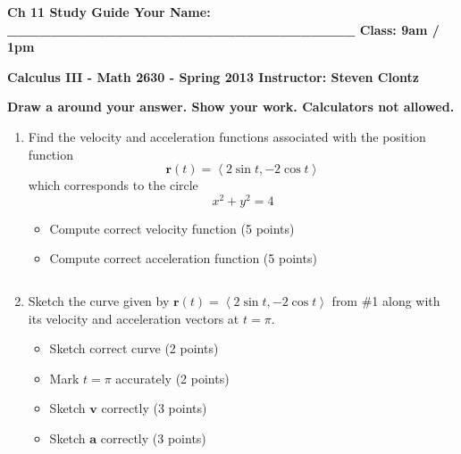 \documentclass[12pt]{article}
\newcommand{\up}{$~$\vspace*{-0.7in}}
\newcommand{\liner}{\noindent\underline{\hspace*{7in}}}
\newcommand{\spac}{\hspace*{3em}}
\renewcommand{\vec}{\mathbf}
\newcommand{\<}{\left<}
\renewcommand{\>}{\right>}
\begin{document}
\up

{\bf Ch 11 Study Guide \hspace*{1em} Your Name: \_\_\_\_\_\_\_\_\_\_\_\_\_\_\_\_\_\_\_\_\_\_\_\_\_\_\_\_\_\_\_\_ \hspace*{1em} Class: 9am / 1pm}

\vspace*{0.2in}

\centerline{ \bf Calculus III - Math 2630 - Spring 2013 \spac Instructor: Steven Clontz}

\vspace*{0.2in}

{\bf Draw a  around your answer. Show your work. Calculators not allowed.}

\indent\liner


\begin{enumerate}

\item Find the velocity and acceleration functions associated with the position function \[\vec{r}(t) = \left<2\sin t,-2\cos t\right>\] which corresponds to the circle \[x^2+y^2=4\]

  \begin{itemize}
    \item Compute correct velocity function (5 points)
    \item Compute correct acceleration function (5 points)
  \end{itemize}

\vspace*{6in}

\liner
\newpage\up

\item Sketch the curve given by $\vec{r}(t) = \left<2\sin t,-2\cos t\right>$ from \#1 along with its velocity and acceleration vectors at $t=\pi$.

  \begin{itemize}
    \item Sketch correct curve (2 points)
    \item Mark $t=\pi$ accurately (2 points)
    \item Sketch $\vec{v}$ correctly (3 points)
    \item Sketch $\vec{a}$ correctly (3 points)
  \end{itemize}

\vspace*{7.5in}

\liner
\newpage\up


\end{enumerate}
\end{document}
